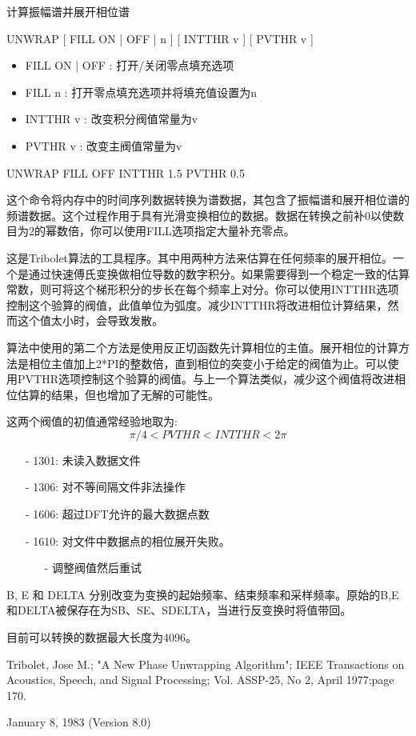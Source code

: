 \label{cmd:unwrap}

计算振幅谱并展开相位谱

UNWRAP [ FILL ON | OFF | n ] [ INTTHR v ] [ PVTHR v ]

\begin{itemize}
\item FILL ON | OFF : 打开/关闭零点填充选项 
\item FILL n : 打开零点填充选项并将填充值设置为n 
\item INTTHR v : 改变积分阀值常量为v 
\item PVTHR v : 改变主阀值常量为v 
\end{itemize}

UNWRAP FILL OFF INTTHR 1.5 PVTHR 0.5

这个命令将内存中的时间序列数据转换为谱数据，其包含了振幅谱和展开相位谱的频谱数据。这个过程作用于具有光滑变换相位的数据。数据在转换之前补0以使数目为2的幂数倍，你可以使用FILL选项指定大量补充零点。

这是Tribolet算法的工具程序。其中用两种方法来估算在任何频率的展开相位。一个是通过快速傅氏变换做相位导数的数字积分。如果需要得到一个稳定一致的估算常数，则可将这个梯形积分的步长在每个频率上对分。你可以使用INTTHR选项控制这个验算的阀值，此值单位为弧度。减少INTTHR将改进相位计算结果，然而这个值太小时，会导致发散。

算法中使用的第二个方法是使用反正切函数先计算相位的主值。展开相位的计算方法是相位主值加上2*PI的整数倍，直到相位的突变小于给定的阀值为止。可以使用PVTHR选项控制这个验算的阀值。与上一个算法类似，减少这个阀值将改进相位估算的结果，但也增加了无解的可能性。

这两个阀值的初值通常经验地取为:
\[ \pi/4 < PVTHR < INTTHR < 2\pi \]

\begin{itemize}
\item[-]1301: 未读入数据文件
\item[-]1306: 对不等间隔文件非法操作
\item[-]1606: 超过DFT允许的最大数据点数
\end{itemize}

\begin{itemize}
\item[-]1610: 对文件中数据点的相位展开失败。
	\begin{itemize}
	\item[-]调整阀值然后重试
	\end{itemize}
\end{itemize}

B, E 和 DELTA 分别改变为变换的起始频率、结束频率和采样频率。原始的B,E和DELTA被保存在为SB、SE、SDELTA，当进行反变换时将值带回。

目前可以转换的数据最大长度为4096。

Tribolet, Jose M.; "A New Phase Unwrapping Algorithm"; IEEE Transactions on Acoustics, 	Speech, and Signal Processing; Vol. ASSP-25, No 2, April 1977;page 170.

January 8, 1983 (Version 8.0)

